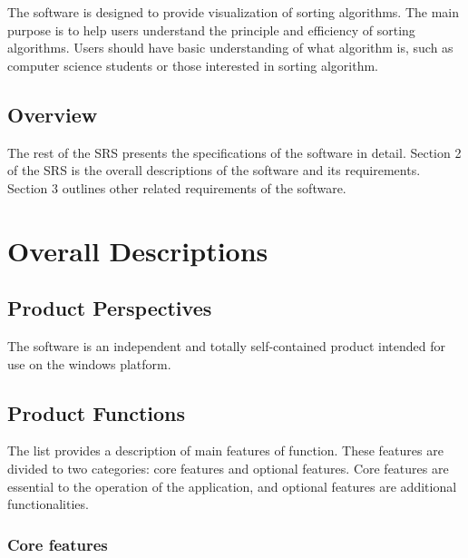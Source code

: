 \documentclass[12pt]{article}
\begin{document}
The software is designed to provide visualization of sorting algorithms. The main purpose is to help users understand the principle and efficiency of sorting algorithms. Users should have basic understanding of what algorithm is, such as computer science students or those interested in sorting algorithm.

\subsection{Overview}
\label{subsec:orvw}

The rest of the SRS presents the specifications of the software in detail. Section 2 of the SRS is the overall descriptions of the software and its requirements. Section 3 outlines other related requirements of the software.  

\section{Overall Descriptions}
\label{sec:ovra decrp}

\subsection{Product Perspectives}
\label{subsec:pdct prspec}

The software is an independent and totally self-contained product intended for use on the windows platform.

\subsection{Product Functions}
\label{subsec:pdct func}

The list provides a description of main features of function. These features are divided to two categories: core features and optional features. Core features are essential to the operation of the application, and optional features are additional functionalities.

\subsubsection{Core features}
\label{subsubsec:core feat}
\end{document}

